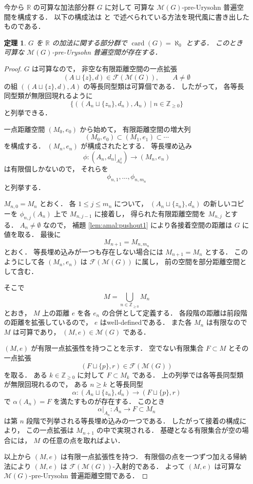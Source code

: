 \documentclass[leqno, 12pt]{jsarticle}
\newtheorem{thm}{定理}[section]
\newcommand{\zz}{\mathbb{Z}}
\newcommand{\yozz}[1]{\zz_{\ge #1}}
\newcommand{\rr}{\mathbb{R}}
\DeclareMathOperator{\card}{card}
\newcommand{\Met}[1]{\mathscr{M}(#1)}
\newcommand{\FinitePart}[1]{\mathscr{F}(#1)}
\newcommand{\FinMet}[1]{\FinitePart{\Met{#1}}}
\newcommand{\restr}[2]{#1|_{#2}}
\begin{document}
今から
$\rr$
の可算な加法部分群
$G$
に対して
可算な
$\Met{G}$-pre-Urysohn
普遍空間を構成する．
以下の構成法は
 \cite{Ury1}
 と
 \cite{Ury2}
で述べられている方法を現代風に書き出したものである．
\begin{thm}\label{thm:amal:exist}
$G$
を
$\rr$
の加法に関する部分群で
$\card(G)=\aleph_0$
とする．
このとき
可算な
$\Met{G}$-pre-Urysohn
普遍空間が存在する．
\end{thm}
\begin{proof}
$G$
は可算なので，
非空な有限距離空間の一点拡張
\[
(A\sqcup\{z\},d)\in\FinMet{G},
\qquad
A\neq\emptyset
\]
の組
$((A\sqcup\{z\},d),A)$
の等長同型類は可算個である．
したがって，
各等長同型類が無限回現れるように
\[
\{((A_n\sqcup\{z_n\},d_n),A_n)\mid
n\in\yozz{0}\}
\]
と列挙できる．

一点距離空間
$(M_0,e_0)$
から始めて，
有限距離空間の増大列
\[
(M_0,e_0)\subset(M_1,e_1)\subset\cdots
\]
を構成する．
$(M_n,e_n)$
が構成されたとする．
等長埋め込み
\[
\phi\colon
(A_n,\restr{d_n}{A_n^2})
\longrightarrow
(M_n,e_n)
\]
は有限個しかないので，
それらを
\[
\phi_{n,1},\dots,\phi_{n,m_n}
\]
と列挙する．

$M_{n,0}=M_n$
とおく．
各
$1\le j\le m_n$
について，
$(A_n\sqcup\{z_n\},d_n)$
の新しいコピーを
$\phi_{n,j}(A_n)$
上で
$M_{n,j-1}$
に接着し，
得られた有限距離空間を
$M_{n,j}$
とする．
$A_n\neq\emptyset$
なので，
補題
\ref{lem:amal:pushout1}
により各接着空間の距離は
$G$
に値を取る．
最後に
\[
M_{n+1}=M_{n,m_n}
\]
とおく．
等長埋め込みが一つも存在しない場合には
$M_{n+1}=M_n$
とする．
このようにして各
$(M_n,e_n)$
は
$\FinMet{G}$
に属し，
前の空間を部分距離空間として含む．

そこで
\[
M=\bigcup_{n\in\yozz{0}}M_n
\]
とおき，
$M$
上の距離
$e$
を各
$e_n$
の合併として定義する．
各段階の距離は前段階の距離を拡張しているので，
$e$
はwell-definedである．
また各
$M_n$
は有限なので
$M$
は可算であり，
$(M,e)\in\Met{G}$
である．

$(M,e)$
が有限一点拡張性を持つことを示す．
空でない有限集合
$F\subset M$
とその一点拡張
\[
(F\sqcup\{p\},r)\in\FinMet{G}
\]
を取る．
ある
$k\in\yozz{0}$
に対して
$F\subset M_k$
である．
上の列挙では各等長同型類が無限回現れるので，
ある
$n\ge k$
と等長同型
\[
\alpha\colon
(A_n\sqcup\{z_n\},d_n)
\longrightarrow
(F\sqcup\{p\},r)
\]
で
$\alpha(A_n)=F$
を満たすものが存在する．
このとき
\[
\restr{\alpha}{A_n}\colon A_n\longrightarrow F\subset M_n
\]
は第
$n$
段階で列挙される等長埋め込みの一つである．
したがって接着の構成により，
この一点拡張は
$M_{n+1}$
の中で実現される．
基礎となる有限集合が空の場合には，
$M$
の任意の点を取ればよい．

以上から
$(M,e)$
は有限一点拡張性を持つ．
有限個の点を一つずつ加える帰納法により
$(M,e)$
は
$\FinMet{G}$-入射的である．
よって
$(M,e)$
は可算な
$\Met{G}$-pre-Urysohn
普遍距離空間である．
\end{proof}
\end{document}
